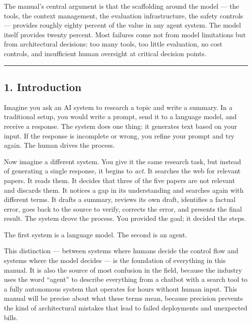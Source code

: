 \documentclass[11pt, a4paper]{article}
\begin{document}
The manual's central argument is that the scaffolding around the model
--- the tools, the context management, the evaluation infrastructure,
the safety controls --- provides roughly eighty percent of the value in
any agent system. The model itself provides twenty percent. Most
failures come not from model limitations but from architectural
decisions: too many tools, too little evaluation, no cost controls, and
insufficient human oversight at critical decision points.

\begin{center}\rule{0.5\linewidth}{0.5pt}\end{center}

\hypertarget{introduction}{%
\subsection{1. Introduction}\label{introduction}}

Imagine you ask an AI system to research a topic and write a summary. In
a traditional setup, you would write a prompt, send it to a language
model, and receive a response. The system does one thing: it generates
text based on your input. If the response is incomplete or wrong, you
refine your prompt and try again. The human drives the process.

Now imagine a different system. You give it the same research task, but
instead of generating a single response, it begins to \emph{act}. It
searches the web for relevant papers. It reads them. It decides that
three of the five papers are not relevant and discards them. It notices
a gap in its understanding and searches again with different terms. It
drafts a summary, reviews its own draft, identifies a factual error,
goes back to the source to verify, corrects the error, and presents the
final result. The system drove the process. You provided the goal; it
decided the steps.

The first system is a language model. The second is an agent.

This distinction --- between systems where humans decide the control
flow and systems where the model decides --- is the foundation of
everything in this manual. It is also the source of most confusion in
the field, because the industry uses the word ``agent'' to describe
everything from a chatbot with a search tool to a fully autonomous
system that operates for hours without human input. This manual will be
precise about what these terms mean, because precision prevents the kind
of architectural mistakes that lead to failed deployments and unexpected
bills.
\end{document}
